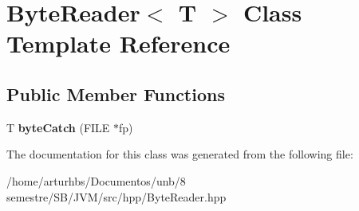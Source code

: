 \hypertarget{classByteReader}{}\section{Byte\+Reader$<$ T $>$ Class Template Reference}
\label{classByteReader}
\subsection*{Public Member Functions}
\begin{DoxyCompactItemize}
\item 
T {\bfseries byte\+Catch} (F\+I\+LE $\ast$fp)\hypertarget{classByteReader_ae570748805994596f51ae033183935d7}{}\label{classByteReader_ae570748805994596f51ae033183935d7}

\end{DoxyCompactItemize}


The documentation for this class was generated from the following file\+:\begin{DoxyCompactItemize}
\item 
/home/arturhbs/\+Documentos/unb/8 semestre/\+S\+B/\+J\+V\+M/src/hpp/Byte\+Reader.\+hpp\end{DoxyCompactItemize}
